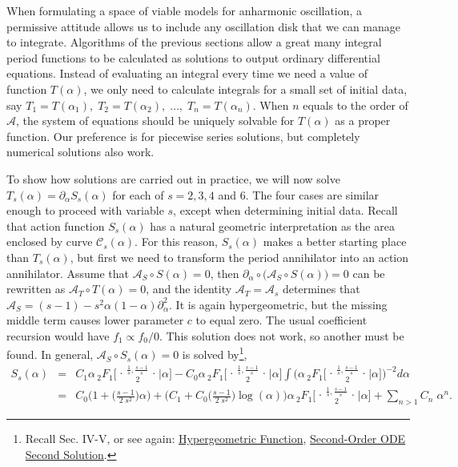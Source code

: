 \documentclass[nofootinbib,preprint]{revtex4-1}
\newcommand{\tFo}[3]{\,_2F_1 \bigg[ 
\genfrac..{0pt}{}{#1}{#2}\bigg| #3 \bigg]}
\begin{document}
When formulating a space of viable models for anharmonic oscillation, a permissive attitude allows us to 
include any oscillation disk that we can manage to integrate. Algorithms of the previous sections 
allow a great many integral period functions to be calculated as solutions to output ordinary differential 
equations. Instead of evaluating an integral every time we need a value of function $T(\alpha)$, we only 
need to calculate integrals for a small set of initial data, say  
$T_1=T(\alpha_1), \; T_2=T(\alpha_2),\;\ldots,\; T_n=T(\alpha_n)$.
When $n$ equals to the order of $\mathcal{A}$, the system of equations 
should be uniquely solvable for $T(\alpha)$ as a proper function. Our preference
is for piecewise series solutions, but completely numerical solutions also work. 

To show how solutions are carried out in practice, we will now solve $T_s(\alpha)=\partial_{\alpha}S_s(\alpha)$
for each of $s=2,3,4$ and $6$. The four cases are similar enough to proceed with variable  $s$,
except when determining initial data. Recall that action function $S_s(\alpha)$ has a natural geometric 
interpretation as the area enclosed by curve $\mathcal{C}_s(\alpha)$. For this reason, $S_s(\alpha)$ makes 
a better starting place than $T_s(\alpha)$, but first we need to transform the period annihilator
into an action annihilator. Assume that $\mathcal{A}_S \circ S(\alpha)=0$, then 
$\partial_{\alpha} \circ \big(\mathcal{A}_S \circ S(\alpha)\big)=0$ can be rewritten as 
$\mathcal{A}_T \circ T(\alpha)=0$, and the identity $\mathcal{A}_T=\mathcal{A}_s$ determines that 
$\mathcal{A}_S=(s-1)-s^2\alpha(1-\alpha)\partial_{\alpha}^2$. It is again hypergeometric, 
but the missing middle term causes lower parameter $c$ to equal zero. The usual coefficient 
recursion would have $f_1 \propto f_0/0$. This solution does not work, so another must 
be found. In general, $\mathcal{A}_S \circ S_s(\alpha)=0$ is solved 
by\footnote{Recall \cite{KLEE2020Prelude} Sec. IV-V, or see again: \href{http://mathworld.wolfram.com/HypergeometricFunction.html}{Hypergeometric Function}, 
\href{http://mathworld.wolfram.com/Second-OrderOrdinaryDifferentialEquationSecondSolution.html}{Second-Order ODE Second Solution}. },
\begin{eqnarray}
S_s(\alpha) &=& C_1 \alpha \tFo{\frac{1}{s},\frac{s-1}{s}}{2}{\alpha}
- C_0 \alpha \tFo{\frac{1}{s},\frac{s-1}{s}}{2}{\alpha}
\int  \bigg(\alpha \tFo{\frac{1}{s},\frac{s-1}{s}}{2}{\alpha}\bigg)^{-2}d\alpha  \nonumber \\
 &=& C_0\bigg(1 +\Big(\frac{s-1}{2\;s^2}\Big)\alpha\bigg)
+ \bigg(C_1+C_0\Big(\frac{s-1}{2\;s^2}\Big)\log(\alpha) \bigg) \alpha 
\tFo{\frac{1}{s},\frac{s-1}{s}}{2}{\alpha}
+ \sum_{n>1}C_n\;\alpha^n. \nonumber  
\end{eqnarray}
\end{document}
